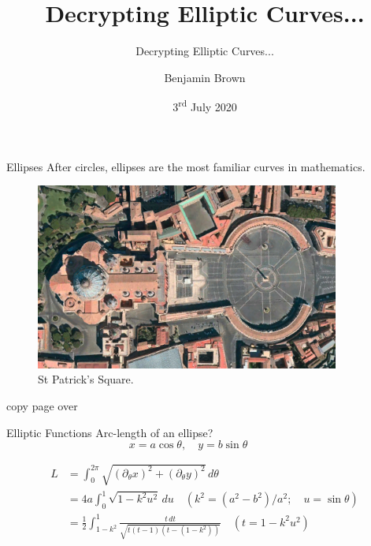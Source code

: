 \documentclass{beamer}
\title[]{Decrypting Elliptic Curves...}
\subtitle{Decrypting Elliptic Curves...}
\author{Benjamin Brown}
\date{3\textsuperscript{rd} July 2020}
\begin{document}

\begin{frame}
  \titlepage
\end{frame}

\begin{frame}[t]{Ellipses}
	After circles, ellipses are the most familiar curves in mathematics.
	\begin{figure}[h]
		\centering
		\includegraphics[width=10cm]{st-patricks-square}
		\caption{St Patrick's Square.}
	\end{figure}
\end{frame}

\begin{frame}	
	copy page over
\end{frame}

\begin{frame}[t]{Elliptic Functions}
	Arc-length of an ellipse?
\begin{equation*}
	x = a\cos\theta,\quad y=b\sin\theta\quad \quad \quad 
\end{equation*}
	
\begin{equation*}
	\begin{split}
		L &= \int_{0}^{2\pi} \sqrt{ ( \partial_{\theta}x )^{2} + ( \partial_{\theta}y )^{2} }\, d\theta \\
		&= 4a \int_{0}^{1} \sqrt{ 1 - k^{2} u^{2} }\, du \quad (k^{2} = (a^{2} - b^{2})/a^{2};\quad u = \sin\theta ) \\
		&= \frac{1}{2} \int_{1-k^{2}}^{1} \frac{t\, dt}{\sqrt{t(t-1)(t - (1-k^{2}))}}\quad (t = 1 - k^{2}u^{2})
	\end{split}
\end{equation*}	
\end{frame}
\end{document}
